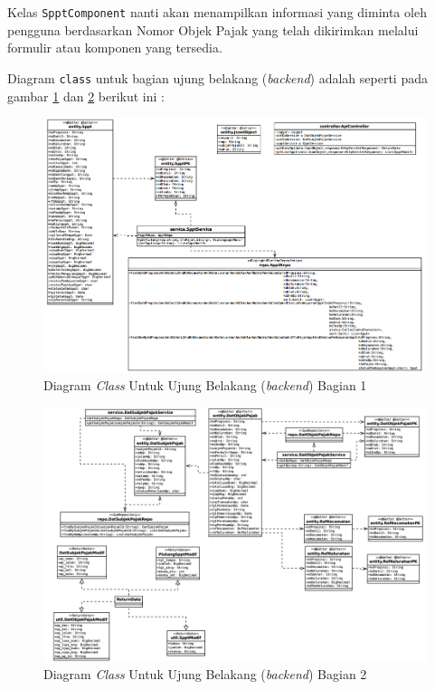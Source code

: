 Kelas \texttt{SpptComponent} nanti akan menampilkan informasi yang diminta oleh pengguna berdasarkan Nomor Objek Pajak yang telah dikirimkan melalui formulir atau komponen yang tersedia.

Diagram \texttt{class} untuk bagian ujung belakang (\textit{backend}) adalah seperti pada gambar \ref{fig:class-dia-be-1} dan \ref{fig:class-dia-be-2} berikut ini :

\begin{figure}[H]
	\centering
	\includegraphics[width=1\textwidth]{./resources/uml/class-dia-be1}
	\caption{Diagram \textit{Class} Untuk Ujung Belakang (\textit{backend}) Bagian 1}
	\label{fig:class-dia-be-1}
\end{figure}

\begin{figure}[H]
	\centering
	\includegraphics[width=1\textwidth]{./resources/uml/class-dia-be2}
	\caption{Diagram \textit{Class} Untuk Ujung Belakang (\textit{backend}) Bagian 2}
	\label{fig:class-dia-be-2}
\end{figure}

